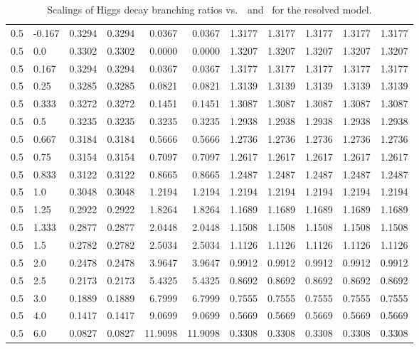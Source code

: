 \begin{table}[h!]
\begin{tabular}{ll rrrrrrrrr}
   0.5  & -0.167 & 0.3294 & 0.3294 & 0.0367 & 0.0367 & 1.3177 & 1.3177 & 1.3177 & 1.3177 & 1.3177 \\
   0.5  & 0.0    & 0.3302 & 0.3302 & 0.0000 & 0.0000 & 1.3207 & 1.3207 & 1.3207 & 1.3207 & 1.3207 \\
   0.5  & 0.167  & 0.3294 & 0.3294 & 0.0367 & 0.0367 & 1.3177 & 1.3177 & 1.3177 & 1.3177 & 1.3177 \\
   0.5  & 0.25   & 0.3285 & 0.3285 & 0.0821 & 0.0821 & 1.3139 & 1.3139 & 1.3139 & 1.3139 & 1.3139 \\
   0.5  & 0.333  & 0.3272 & 0.3272 & 0.1451 & 0.1451 & 1.3087 & 1.3087 & 1.3087 & 1.3087 & 1.3087 \\
   0.5  & 0.5    & 0.3235 & 0.3235 & 0.3235 & 0.3235 & 1.2938 & 1.2938 & 1.2938 & 1.2938 & 1.2938 \\
   0.5  & 0.667  & 0.3184 & 0.3184 & 0.5666 & 0.5666 & 1.2736 & 1.2736 & 1.2736 & 1.2736 & 1.2736 \\
   0.5  & 0.75   & 0.3154 & 0.3154 & 0.7097 & 0.7097 & 1.2617 & 1.2617 & 1.2617 & 1.2617 & 1.2617 \\
   0.5  & 0.833  & 0.3122 & 0.3122 & 0.8665 & 0.8665 & 1.2487 & 1.2487 & 1.2487 & 1.2487 & 1.2487 \\
   0.5  & 1.0    & 0.3048 & 0.3048 & 1.2194 & 1.2194 & 1.2194 & 1.2194 & 1.2194 & 1.2194 & 1.2194 \\
   0.5  & 1.25   & 0.2922 & 0.2922 & 1.8264 & 1.8264 & 1.1689 & 1.1689 & 1.1689 & 1.1689 & 1.1689 \\
   0.5  & 1.333  & 0.2877 & 0.2877 & 2.0448 & 2.0448 & 1.1508 & 1.1508 & 1.1508 & 1.1508 & 1.1508 \\
   0.5  & 1.5    & 0.2782 & 0.2782 & 2.5034 & 2.5034 & 1.1126 & 1.1126 & 1.1126 & 1.1126 & 1.1126 \\
   0.5  & 2.0    & 0.2478 & 0.2478 & 3.9647 & 3.9647 & 0.9912 & 0.9912 & 0.9912 & 0.9912 & 0.9912 \\
   0.5  & 2.5    & 0.2173 & 0.2173 & 5.4325 & 5.4325 & 0.8692 & 0.8692 & 0.8692 & 0.8692 & 0.8692 \\
   0.5  & 3.0    & 0.1889 & 0.1889 & 6.7999 & 6.7999 & 0.7555 & 0.7555 & 0.7555 & 0.7555 & 0.7555 \\
   0.5  & 4.0    & 0.1417 & 0.1417 & 9.0699 & 9.0699 & 0.5669 & 0.5669 & 0.5669 & 0.5669 & 0.5669 \\
   0.5  & 6.0    & 0.0827 & 0.0827 & 11.9098 & 11.9098 & 0.3308 & 0.3308 & 0.3308 & 0.3308 & 0.3308 \\\hline
    \end{tabular}
    \caption{Scalings of Higgs decay branching ratios vs.\ \Ct\ and \ for the resolved model.}\label{tab:brscalingK6_0p5}
 \end{table}

